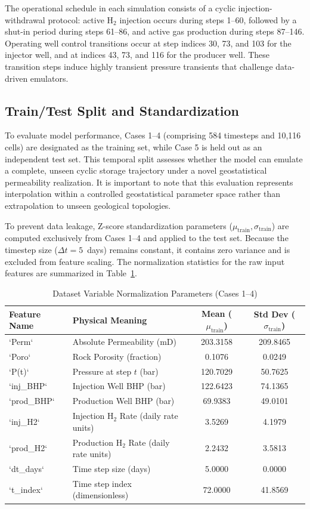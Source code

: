 \documentclass[10pt,twocolumn]{article}
\begin{document}
The operational schedule in each simulation consists of a cyclic injection-withdrawal protocol: active H$_2$ injection occurs during steps 1--60, followed by a shut-in period during steps 61--86, and active gas production during steps 87--146. Operating well control transitions occur at step indices 30, 73, and 103 for the injector well, and at indices 43, 73, and 116 for the producer well. These transition steps induce highly transient pressure transients that challenge data-driven emulators.

\subsection{Train/Test Split and Standardization}
To evaluate model performance, Cases 1--4 (comprising 584 timesteps and 10,116 cells) are designated as the training set, while Case 5 is held out as an independent test set. This temporal split assesses whether the model can emulate a complete, unseen cyclic storage trajectory under a novel geostatistical permeability realization. It is important to note that this evaluation represents interpolation within a controlled geostatistical parameter space rather than extrapolation to unseen geological topologies.

To prevent data leakage, Z-score standardization parameters ($\mu_{\text{train}}, \sigma_{\text{train}}$) are computed exclusively from Cases 1--4 and applied to the test set. Because the timestep size ($\Delta t = 5$~days) remains constant, it contains zero variance and is excluded from feature scaling. The normalization statistics for the raw input features are summarized in Table~\ref{tab:dataset_stats}.

\begin{table}[t]
\centering
\caption{Dataset Variable Normalization Parameters (Cases 1--4)}
\label{tab:dataset_stats}
\begin{tabularx}{\linewidth}{lXcc}
\toprule
\textbf{Feature Name} & \textbf{Physical Meaning} & \textbf{Mean ($\mu_{\text{train}}$)} & \textbf{Std Dev ($\sigma_{\text{train}}$)} \\
\midrule
`Perm` & Absolute Permeability (mD) & 203.3158 & 209.8465 \\
`Poro` & Rock Porosity (fraction) & 0.1076 & 0.0249 \\
`P(t)` & Pressure at step $t$ (bar) & 120.7029 & 50.7625 \\
`inj\_BHP` & Injection Well BHP (bar) & 122.6423 & 74.1365 \\
`prod\_BHP` & Production Well BHP (bar) & 69.9383 & 49.0101 \\
`inj\_H2` & Injection H$_2$ Rate (daily rate units) & 3.5269 & 4.1979 \\
`prod\_H2` & Production H$_2$ Rate (daily rate units) & 2.2432 & 3.5813 \\
`dt\_days` & Time step size (days) & 5.0000 & 0.0000 \\
`t\_index` & Time step index (dimensionless) & 72.0000 & 41.8569 \\
\bottomrule
\end{tabularx}
\end{table}
\end{document}
